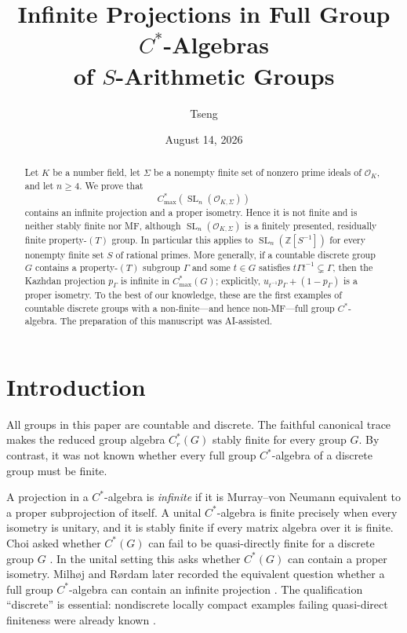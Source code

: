 \documentclass[11pt]{article}
\title{Infinite Projections in Full Group $C^*$-Algebras\\
of $S$-Arithmetic Groups}
\author{Tseng}
\date{August 14, 2026}
\newcommand{\Z}{\mathbb Z}
\newcommand{\OK}{\mathcal O_K}
\newcommand{\SL}{\operatorname{SL}}
\newcommand{\Cmax}[1]{C^*_{\max}(#1)}
\newcommand{\Cr}[1]{C^*_r(#1)}
\begin{document}
\maketitle

\begin{abstract}
Let $K$ be a number field, let $\Sigma$ be a nonempty finite set of nonzero
prime ideals of $\OK$, and let $n\geq4$.  We prove that
\[
 \Cmax{\SL_n(\mathcal O_{K,\Sigma})}
\]
contains an infinite projection and a proper isometry.  Hence it is not
finite and is neither stably finite nor MF, although
$\SL_n(\mathcal O_{K,\Sigma})$ is a finitely presented, residually finite
property-$(T)$ group.  In particular this applies to
$\SL_n(\Z[S^{-1}])$ for every nonempty finite set $S$ of rational primes.
More generally, if a countable discrete group $G$ contains a property-$(T)$
subgroup $\Gamma$ and some $t\in G$ satisfies
$t\Gamma t^{-1}\subsetneq\Gamma$, then the Kazhdan projection $p_\Gamma$
is infinite in $\Cmax G$; explicitly,
$u_{t^{-1}}p_\Gamma+(1-p_\Gamma)$ is a proper isometry.  To the best of our
knowledge, these are the first examples of countable discrete groups with a
non-finite---and hence non-MF---full group $C^*$-algebra.  The preparation of
this manuscript was AI-assisted.
\end{abstract}

\section{Introduction}

All groups in this paper are countable and discrete.  The faithful canonical
trace makes the reduced group algebra $\Cr G$ stably finite for every group
$G$.  By contrast, it was not known whether every full group $C^*$-algebra of
a discrete group must be finite.

A projection in a $C^*$-algebra is \emph{infinite} if it is
Murray--von Neumann equivalent to a proper subprojection of itself.  A unital
$C^*$-algebra is finite precisely when every isometry is unitary, and it is
stably finite if every matrix algebra over it is finite.  Choi asked whether
$C^*(G)$ can fail to be quasi-directly finite for a discrete group $G$
\cite[Question~1]{ChoiQDF}.  In the unital setting this asks whether $C^*(G)$
can contain a proper isometry.  Milh\o j and R\o rdam later recorded the
equivalent question whether a full group $C^*$-algebra can contain an infinite
projection \cite[Section~6]{MilhojRordam}.  The qualification ``discrete'' is
essential: nondiscrete locally compact examples failing quasi-direct finiteness
were already known \cite[Section~3]{ChoiQDF}.
\end{document}

